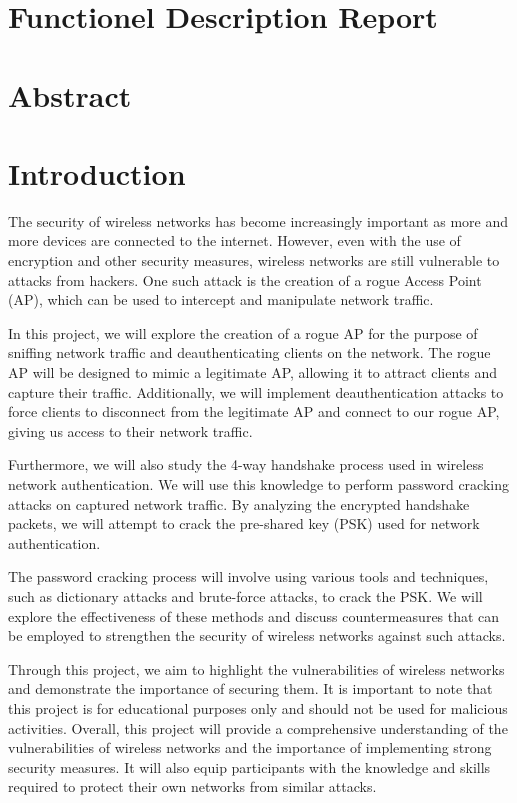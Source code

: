 \section*{Functionel Description Report}
\tableofcontents
\newpage

\section{Abstract}

\section{Introduction}
The security of wireless networks has become increasingly important as more and more devices are connected to the internet. However, even with the use of encryption and other security measures, wireless networks are still vulnerable to attacks from hackers. One such attack is the creation of a rogue Access Point (AP), which can be used to intercept and manipulate network traffic.

In this project, we will explore the creation of a rogue AP for the purpose of sniffing network traffic and deauthenticating clients on the network. The rogue AP will be designed to mimic a legitimate AP, allowing it to attract clients and capture their traffic. Additionally, we will implement deauthentication attacks to force clients to disconnect from the legitimate AP and connect to our rogue AP, giving us access to their network traffic.

Furthermore, we will also study the 4-way handshake process used in wireless network authentication. We will use this knowledge to perform password cracking attacks on captured network traffic. By analyzing the encrypted handshake packets, we will attempt to crack the pre-shared key (PSK) used for network authentication.

The password cracking process will involve using various tools and techniques, such as dictionary attacks and brute-force attacks, to crack the PSK. We will explore the effectiveness of these methods and discuss countermeasures that can be employed to strengthen the security of wireless networks against such attacks.

Through this project, we aim to highlight the vulnerabilities of wireless networks and demonstrate the importance of securing them. It is important to note that this project is for educational purposes only and should not be used for malicious activities. Overall, this project will provide a comprehensive understanding of the vulnerabilities of wireless networks and the importance of implementing strong security measures. It will also equip participants with the knowledge and skills required to protect their own networks from similar attacks.




